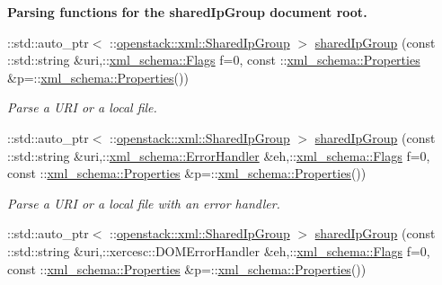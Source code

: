 \begin{Indent}{\bf Parsing functions for the sharedIpGroup document root.}\par
\begin{DoxyCompactItemize}
\item 
::std::auto\_\-ptr$<$ ::\hyperlink{classopenstack_1_1xml_1_1SharedIpGroup}{openstack::xml::SharedIpGroup} $>$ \hyperlink{namespaceopenstack_1_1xml_a0f7ce7a63f241cfe9a9103b30bc627d3}{sharedIpGroup} (const ::std::string \&uri,::\hyperlink{namespacexml__schema_affb4c227cbd9aa7453dd1dc5a1401943}{xml\_\-schema::Flags} f=0, const ::\hyperlink{namespacexml__schema_ad27ce19a7ee1d3b1064092648898f64c}{xml\_\-schema::Properties} \&p=::\hyperlink{namespacexml__schema_ad27ce19a7ee1d3b1064092648898f64c}{xml\_\-schema::Properties}())
\begin{DoxyCompactList}\small\item\em Parse a URI or a local file. \item\end{DoxyCompactList}\item 
::std::auto\_\-ptr$<$ ::\hyperlink{classopenstack_1_1xml_1_1SharedIpGroup}{openstack::xml::SharedIpGroup} $>$ \hyperlink{namespaceopenstack_1_1xml_a930a30b96589361b77bb50d98bf62b79}{sharedIpGroup} (const ::std::string \&uri,::\hyperlink{namespacexml__schema_ab1c9361bfd3b404eaabf0c31eded79dc}{xml\_\-schema::ErrorHandler} \&eh,::\hyperlink{namespacexml__schema_affb4c227cbd9aa7453dd1dc5a1401943}{xml\_\-schema::Flags} f=0, const ::\hyperlink{namespacexml__schema_ad27ce19a7ee1d3b1064092648898f64c}{xml\_\-schema::Properties} \&p=::\hyperlink{namespacexml__schema_ad27ce19a7ee1d3b1064092648898f64c}{xml\_\-schema::Properties}())
\begin{DoxyCompactList}\small\item\em Parse a URI or a local file with an error handler. \item\end{DoxyCompactList}\item 
::std::auto\_\-ptr$<$ ::\hyperlink{classopenstack_1_1xml_1_1SharedIpGroup}{openstack::xml::SharedIpGroup} $>$ \hyperlink{namespaceopenstack_1_1xml_a24fec8d2a13dc8a0abad577946c3b1e7}{sharedIpGroup} (const ::std::string \&uri,::xercesc::DOMErrorHandler \&eh,::\hyperlink{namespacexml__schema_affb4c227cbd9aa7453dd1dc5a1401943}{xml\_\-schema::Flags} f=0, const ::\hyperlink{namespacexml__schema_ad27ce19a7ee1d3b1064092648898f64c}{xml\_\-schema::Properties} \&p=::\hyperlink{namespacexml__schema_ad27ce19a7ee1d3b1064092648898f64c}{xml\_\-schema::Properties}())

\end{DoxyCompactItemize}
\end{Indent}
